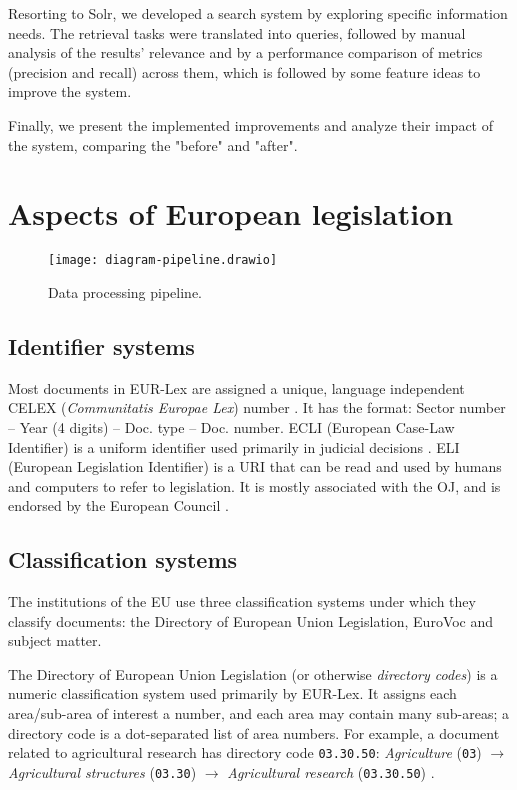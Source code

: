 \documentclass[sigconf, authorversion]{acmart}
\begin{document}
Resorting to Solr, we developed a search system by exploring specific information needs. The retrieval tasks were translated into queries, followed by manual analysis of the results' relevance and by a performance comparison of metrics (precision and recall) across them, which is followed by some feature ideas to improve the system.

Finally, we present the implemented improvements and analyze their impact of the system, comparing the "before" and "after".


\section{Aspects of European legislation}

\begin{figure*}[b]
  \texttt{[image: diagram-pipeline.drawio]}
  \caption{Data processing pipeline.}
\end{figure*}

\subsection{Identifier systems}

Most documents in EUR-Lex are assigned a unique, language independent CELEX (\textit{Communitatis Europae Lex}) number \cite{celex}. It has the format: Sector number -- Year (4 digits) -- Doc. type -- Doc. number.
ECLI (European Case-Law Identifier) is a uniform identifier used primarily in judicial decisions \cite{ecli}.
ELI (European Legislation Identifier) is a URI that can be read and used by humans and computers to refer to legislation. It is mostly associated with the OJ, and is endorsed by the European Council \cite{eli}.

\subsection{Classification systems}

The institutions of the EU use three classification systems under which they classify documents: the Directory of European Union Legislation, EuroVoc and subject matter.

The Directory of European Union Legislation (or otherwise \textit{directory codes}) is a numeric classification system used primarily by EUR-Lex. It assigns each area/sub-area of interest a number, and each area may contain many sub-areas; a directory code is a dot-separated list of area numbers. For example, a document related to agricultural research has directory code \texttt{03.30.50}: \textit{Agriculture} (\texttt{03}) $\rightarrow$ \textit{Agricultural structures} (\texttt{03.30}) $\rightarrow$ \textit{Agricultural research} (\texttt{03.30.50}) \cite{directory-legal-acts}.
\end{document}
